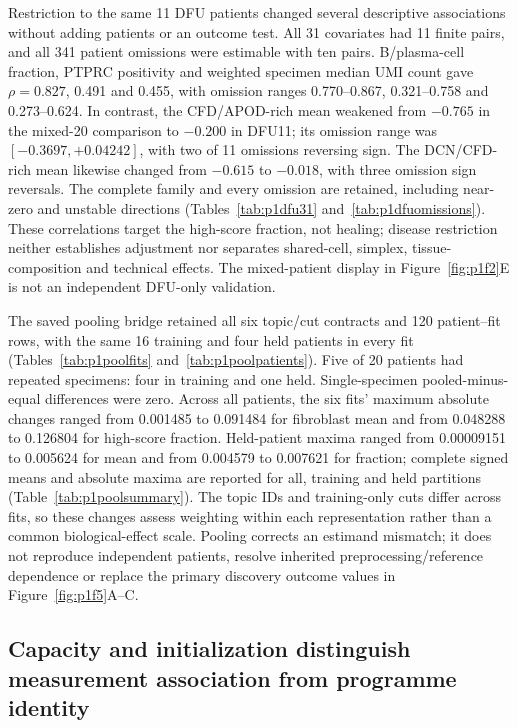 \documentclass[10pt,a4paper]{article}
\begin{document}
Restriction to the same 11 DFU patients changed several descriptive associations without adding patients or an outcome test. All 31 covariates had 11 finite pairs, and all 341 patient omissions were estimable with ten pairs. B/plasma-cell fraction, PTPRC positivity and weighted specimen median UMI count gave $\rho=0.827$, 0.491 and 0.455, with omission ranges 0.770--0.867, 0.321--0.758 and 0.273--0.624. In contrast, the CFD/APOD-rich mean weakened from $-0.765$ in the mixed-20 comparison to $-0.200$ in DFU11; its omission range was $[-0.3697,+0.04242]$, with two of 11 omissions reversing sign. The DCN/CFD-rich mean likewise changed from $-0.615$ to $-0.018$, with three omission sign reversals. The complete family and every omission are retained, including near-zero and unstable directions (Tables~\ref{tab:p1dfu31} and~\ref{tab:p1dfuomissions}). These correlations target the high-score fraction, not healing; disease restriction neither establishes adjustment nor separates shared-cell, simplex, tissue-composition and technical effects. The mixed-patient display in Figure~\ref{fig:p1f2}E is not an independent DFU-only validation.

The saved pooling bridge retained all six topic/cut contracts and 120 patient--fit rows, with the same 16 training and four held patients in every fit (Tables~\ref{tab:p1poolfits} and~\ref{tab:p1poolpatients}). Five of 20 patients had repeated specimens: four in training and one held. Single-specimen pooled-minus-equal differences were zero. Across all patients, the six fits' maximum absolute changes ranged from 0.001485 to 0.091484 for fibroblast mean and from 0.048288 to 0.126804 for high-score fraction. Held-patient maxima ranged from 0.00009151 to 0.005624 for mean and from 0.004579 to 0.007621 for fraction; complete signed means and absolute maxima are reported for all, training and held partitions (Table~\ref{tab:p1poolsummary}). The topic IDs and training-only cuts differ across fits, so these changes assess weighting within each representation rather than a common biological-effect scale. Pooling corrects an estimand mismatch; it does not reproduce independent patients, resolve inherited preprocessing/reference dependence or replace the primary discovery outcome values in Figure~\ref{fig:p1f5}A--C.

\subsection{Capacity and initialization distinguish measurement association from programme identity}
\end{document}
